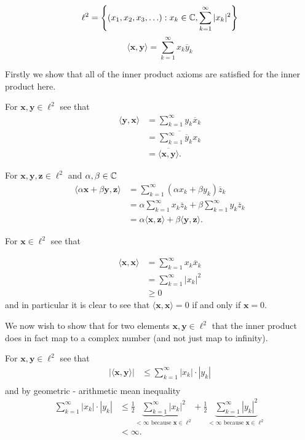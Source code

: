\documentclass{unswmaths}
\begin{document}
\begin{definition}[ $\ell^2 $ ]
	$$ 
		\ell^2 = \left\{ (x_1, x_2, x_3, \ldots ) : x_k \in \mathbb{C}, \sum_{k=1}^\infty |x_k|^2 \right\}
	$$
	$$
		\langle \mathbf{x}, \mathbf{y} \rangle =  \sum_{k=1}^\infty x_k \overline{y}_k 
	$$
\end{definition}

Firstly we show that all of the inner product axioms are satisfied for the inner product here.

For $ \mathbf{x}, \mathbf{y} \in \ell^2 $ see that
\begin{align*}
	\langle \mathbf{y}, \mathbf{x} \rangle &= \sum_{k=1}^\infty y_k \overline{x}_{k} \\
		&= \overline{\sum_{k=1}^\infty \overline{y}_k x_{k}}\\
		&= \overline{ \langle \mathbf{x}, \mathbf{y} \rangle }.
\end{align*}

For  $ \mathbf{x}, \mathbf{y}, \mathbf{z} \in \ell^2 $ and $ \alpha, \beta \in \mathbb{C} $
\begin{align*}
	\langle \alpha \mathbf{x} + \beta \mathbf{y}, \mathbf{z} \rangle &= \sum_{k = 1}^\infty (\alpha x_k + \beta y_k) \overline{z}_k  \\
		&= \alpha \sum_{k=1}^\infty x_k \overline{z}_k + \beta \sum_{k=1}^\infty y_k \overline{z}_k \\
		&= \alpha \langle \mathbf{x}, \mathbf{z} \rangle + \beta \langle \mathbf{y}, \mathbf{z} \rangle.
\end{align*}

For $ \mathbf{x} \in \ell^2 $ see that

\begin{align*}
	\langle \mathbf{x}, \mathbf{x} \rangle &= \sum_{k=1}^\infty x_k \overline{x}_k \\
		&= \sum_{k =1}^\infty |x_k|^2 \\
		&\geq 0
\end{align*}
and in particular it is clear to see that $ \langle \mathbf{x}, \mathbf{x} \rangle = 0 $ if and only if
$ \mathbf{x} = 0 $.

We now wish to show that for two elements $ \mathbf{x}, \mathbf{y} \in \ell^2 $ that the inner product does
in fact map to a complex number (and not just map to infinity).

For $ \mathbf{x}, \mathbf{y} \in \ell^2 $  see that
\begin{align*}
	|\langle \mathbf{x}, \mathbf{y} \rangle | &\leq \sum_{k=1}^\infty |x_k|\cdot|y_k| \\
\end{align*}
and by geometric - arithmetic mean inequality
\begin{align*}
	\sum_{k=1}^\infty |x_k|\cdot|y_k|
		&\leq \frac{1}{2} \underbrace{\sum_{k=1}^\infty |x_k|^2}_{ < \infty \text{ because } \mathbf{x} \in \ell^2 } 
			+ \frac{1}{2} \underbrace{\sum_{k=1}^\infty |y_k|^2}_{< \infty \text{ because } \mathbf{x} \in \ell^2} \\
			&< \infty.
\end{align*}
\end{document}
